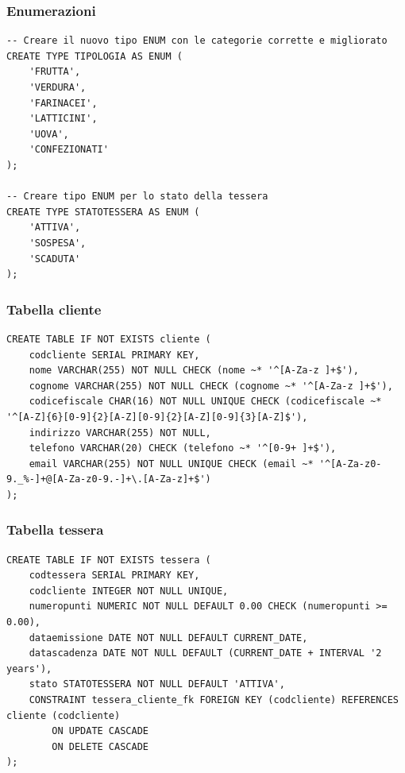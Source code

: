 \documentclass[a4paper,12pt]{article}
\begin{document}
\subsubsection*{Enumerazioni}
\begin{lstlisting}[style=sqlstyle]
-- Creare il nuovo tipo ENUM con le categorie corrette e migliorato
CREATE TYPE TIPOLOGIA AS ENUM (
    'FRUTTA',
    'VERDURA', 
    'FARINACEI',
    'LATTICINI',
    'UOVA',
    'CONFEZIONATI'
);

-- Creare tipo ENUM per lo stato della tessera
CREATE TYPE STATOTESSERA AS ENUM (
    'ATTIVA',
    'SOSPESA',
    'SCADUTA'
);
\end{lstlisting}


\subsubsection*{Tabella cliente}
\vspace{1.5em}
\begin{lstlisting}[style=sqlstyle]
CREATE TABLE IF NOT EXISTS cliente (
    codcliente SERIAL PRIMARY KEY,
    nome VARCHAR(255) NOT NULL CHECK (nome ~* '^[A-Za-z ]+$'),
    cognome VARCHAR(255) NOT NULL CHECK (cognome ~* '^[A-Za-z ]+$'),
    codicefiscale CHAR(16) NOT NULL UNIQUE CHECK (codicefiscale ~* '^[A-Z]{6}[0-9]{2}[A-Z][0-9]{2}[A-Z][0-9]{3}[A-Z]$'),
    indirizzo VARCHAR(255) NOT NULL,
    telefono VARCHAR(20) CHECK (telefono ~* '^[0-9+ ]+$'),
    email VARCHAR(255) NOT NULL UNIQUE CHECK (email ~* '^[A-Za-z0-9._%-]+@[A-Za-z0-9.-]+\.[A-Za-z]+$')
);
\end{lstlisting}
\vspace{1.5em}
\subsubsection*{Tabella tessera}

\vspace{1.5em}
\begin{lstlisting}[style=sqlstyle]
CREATE TABLE IF NOT EXISTS tessera (
    codtessera SERIAL PRIMARY KEY,
    codcliente INTEGER NOT NULL UNIQUE,
    numeropunti NUMERIC NOT NULL DEFAULT 0.00 CHECK (numeropunti >= 0.00),
    dataemissione DATE NOT NULL DEFAULT CURRENT_DATE,
    datascadenza DATE NOT NULL DEFAULT (CURRENT_DATE + INTERVAL '2 years'),
    stato STATOTESSERA NOT NULL DEFAULT 'ATTIVA',
    CONSTRAINT tessera_cliente_fk FOREIGN KEY (codcliente) REFERENCES cliente (codcliente)
        ON UPDATE CASCADE
        ON DELETE CASCADE
);
\end{lstlisting}
\vspace{1.5em}
\end{document}
